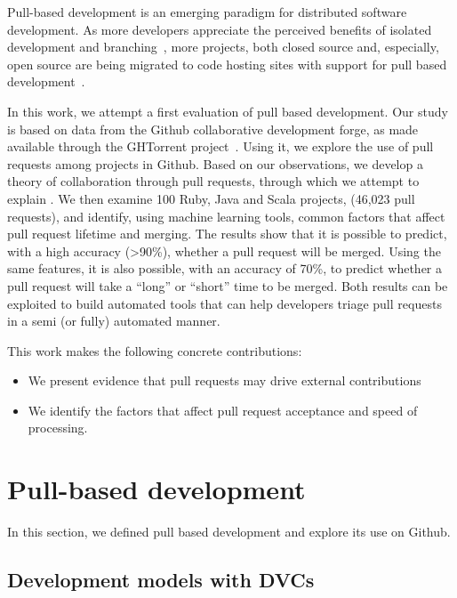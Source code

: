\documentclass{sig-alternate}
\begin{document}
Pull-based development is an emerging paradigm for distributed software
development. As more developers appreciate the perceived benefits of isolated
development and branching~\cite{Bird12}, more projects, both closed source and,
especially, open source are being migrated to code hosting sites with support
for pull based development~\cite{Barr12}. 

In this work, we attempt a first evaluation of pull based development.  Our
study is based on data from the Github collaborative development forge, as made
available through the GHTorrent project~\cite{GS12}. Using it, we explore the
use of pull requests among projects in Github. Based on our observations,
we develop a theory of collaboration through pull requests, through
which we attempt to explain . We then examine 100 Ruby, Java
and Scala projects, (46,023 pull requests), and identify, using machine
learning tools, common factors that affect pull request lifetime and merging.
The results show that it is possible to predict, with a high accuracy (>90\%),
whether a pull request will be merged. Using the same features, it is also
possible, with an accuracy of 70\%, to predict whether a pull request will take
a ``long'' or ``short'' time to be merged. Both results can be exploited to
build automated tools that can help developers triage pull requests in
a semi (or fully) automated manner.

This work makes the following concrete contributions:

\begin{itemize}

  \item We present evidence that pull requests may drive external contributions 

  \item We identify the factors that affect pull request acceptance and
    speed of processing.

\end{itemize}

\section{Pull-based development}

In this section, we defined pull based development and explore its use
on Github.

\subsection{Development models with DVCs}
\end{document}
